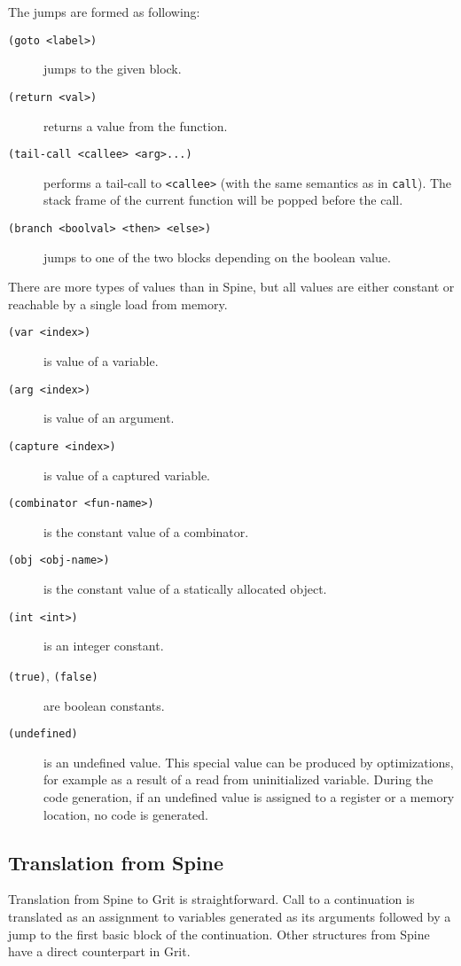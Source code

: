 The jumps are formed as following:

\begin{description}
  \item[\texttt{(goto <label>)}] jumps to the given block.
  \item[\texttt{(return <val>)}] returns a value from the function.
  \item[\texttt{(tail-call <callee> <arg>...)}] performs a tail-call to
    \texttt{<callee>} (with the same semantics as in \texttt{call}). The stack
    frame of the current function will be popped before the call.
  \item[\texttt{(branch <boolval> <then> <else>)}] jumps to one of the two
    blocks depending on the boolean value.
\end{description}

There are more types of values than in Spine, but all values are either constant
or reachable by a single load from memory.

\begin{description}
  \item[\texttt{(var <index>)}] is value of a variable.
  \item[\texttt{(arg <index>)}] is value of an argument.
  \item[\texttt{(capture <index>)}] is value of a captured variable.
  \item[\texttt{(combinator <fun-name>)}] is the constant value of a combinator.
  \item[\texttt{(obj <obj-name>)}] is the constant value of a statically
    allocated object.
  \item[\texttt{(int <int>)}] is an integer constant.
  \item[\texttt{(true)}, \texttt{(false)}] are boolean constants.
  \item[\texttt{(undefined)}] is an undefined value. This special value can be
    produced by optimizations, for example as a result of a read from
    uninitialized variable. During the code generation, if an undefined value is
    assigned to a register or a memory location, no code is generated.
\end{description}

\subsection{Translation from Spine}

Translation from Spine to Grit is straightforward. Call to a continuation is
translated as an assignment to variables generated as its arguments followed by
a jump to the first basic block of the continuation. Other structures from Spine
have a direct counterpart in Grit.

